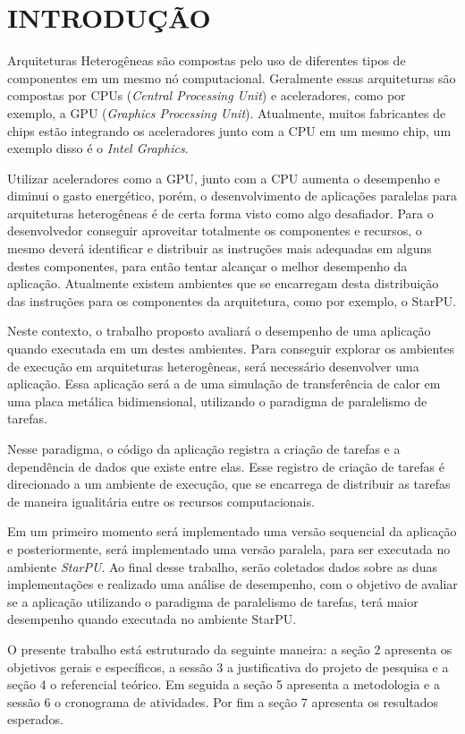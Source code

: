 
\chapter{INTRODUÇÃO}
\label{chap:introducao}

Arquiteturas Heterogêneas são compostas pelo uso de diferentes tipos de componentes em um mesmo nó computacional.
Geralmente essas arquiteturas são compostas por CPUs (\textit{Central Processing Unit}) e aceleradores, como por exemplo, a GPU (\textit{Graphics Processing Unit}).
Atualmente, muitos fabricantes de chips estão integrando os aceleradores junto com a CPU em um mesmo chip, um exemplo disso é o \textit{Intel Graphics}. 

Utilizar aceleradores como a GPU, junto com a CPU aumenta o desempenho e diminui o gasto energético, porém,
o desenvolvimento de aplicações paralelas para arquiteturas heterogêneas é de certa forma visto como algo desafiador.
Para o desenvolvedor conseguir aproveitar totalmente os componentes e recursos, o mesmo deverá identificar e distribuir as instruções mais adequadas em alguns destes componentes,
para então tentar alcançar o melhor desempenho da aplicação.
Atualmente existem ambientes que se encarregam desta distribuição das instruções para os componentes da arquitetura, como por exemplo, o StarPU.

Neste contexto, o trabalho proposto avaliará o desempenho de uma aplicação quando executada em um destes ambientes.
Para conseguir explorar os ambientes de execução em arquiteturas heterogêneas, será necessário desenvolver uma aplicação.
Essa aplicação será a de uma simulação de transferência de calor em uma placa metálica bidimensional, utilizando o paradigma de paralelismo de tarefas.

Nesse paradigma, o código da aplicação registra a criação de tarefas e a dependência de dados que existe entre elas.
Esse registro de criação de tarefas é direcionado a um ambiente de execução, que se encarrega de distribuir as tarefas de maneira igualitária entre os recursos computacionais.

Em um primeiro momento será implementado uma versão sequencial da aplicação e posteriormente, será implementado uma versão paralela, para ser executada no ambiente \textit{StarPU}.
Ao final desse trabalho, serão coletados dados sobre as duas implementações e realizado uma análise de desempenho, com o objetivo de avaliar se a aplicação utilizando o paradigma de paralelismo de tarefas, terá maior desempenho quando executada no ambiente StarPU.

O presente trabalho está estruturado da seguinte maneira: a seção 2 apresenta os objetivos gerais e específicos, a sessão 3 a justificativa do projeto de pesquisa e a seção 4 o referencial teórico.
Em seguida a seção 5 apresenta a metodologia e a sessão 6 o cronograma de atividades.
Por fim a seção 7 apresenta os resultados esperados.
